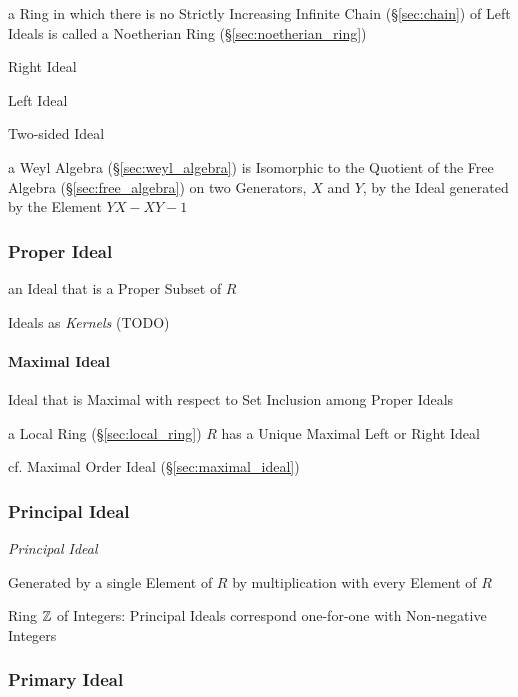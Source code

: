 a Ring in which there is no Strictly Increasing Infinite Chain
(\S\ref{sec:chain}) of Left Ideals is called a Noetherian Ring
(\S\ref{sec:noetherian_ring})

Right Ideal

Left Ideal

Two-sided Ideal

\fist a Weyl Algebra (\S\ref{sec:weyl_algebra}) is Isomorphic to the Quotient
of the Free Algebra (\S\ref{sec:free_algebra}) on two Generators, $X$ and $Y$,
by the Ideal generated by the Element $YX - XY - 1$



\subsubsection{Proper Ideal}\label{sec:proper_ideal}

an Ideal that is a Proper Subset of $R$

Ideals as \emph{Kernels} (TODO)



\paragraph{Maximal Ideal}\label{sec:maximal_ring_ideal}\hfill

Ideal that is Maximal with respect to Set Inclusion among Proper Ideals

a Local Ring (\S\ref{sec:local_ring}) $R$ has a Unique Maximal Left or Right
Ideal

cf. Maximal Order Ideal (\S\ref{sec:maximal_ideal})



\subsubsection{Principal Ideal}\label{sec:principal_ideal}

\emph{Principal Ideal}

Generated by a single Element of $R$ by multiplication with every
Element of $R$

Ring $\mathbb{Z}$ of Integers: Principal Ideals correspond one-for-one with
Non-negative Integers



\subsubsection{Primary Ideal}\label{sec:primary_ideal}

